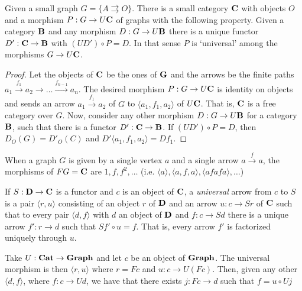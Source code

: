 \documentclass[acmsmall,screen, nonacm, anonymous]{acmart}
\begin{document}
\begin{theorem}

Given a small graph $G = \{A \rightrightarrows O\}$.
There is a small category $\mathbf{C}$ with objects $O$ and a morphism $P : G \to U\mathbf{C}$ of graphs with the following property.
Given a category $\mathbf{B}$  and any morphism $D : G \to U\mathbf{B}$ there is a unique functor $D' : \mathbf{C} \to \mathbf{B}$ with $(U D') \circ P = D$.
In that sense $P$ is `universal' among the morphisms $G \to U\mathbf{C}$.
\end{theorem}
\begin{proof}

Let the objects of $\mathbf{C}$ be the ones of $\mathbf{G}$ and the arrows be the finite paths $a_1 \xrightarrow{f_1} a_2 \xrightarrow{} \ldots \xrightarrow{f_{n-1}} a_{n}$.
The desired morphism $P : G \to U\mathbf{C}$ is identity on objects and sends an arrow $a_1 \xrightarrow{f_{1}} a_2$ of $G$ to $\langle a_1, f_1, a_{2} \rangle$ of $U\mathbf{C}$.
That is, $\mathbf{C}$ is a free category over $G$.
Now, consider any other morphism $D : G \to U\mathbf{B}$ for a category $\mathbf{B}$, such that there is a functor $D' : \mathbf{C} \to \mathbf{B}$.
If $(UD') \circ P = D$, then $D_{O}(G) = D'_{O}(C)$ and $D'\langle a_{1}, f_{1}, a_{2} \rangle = Df_{1}$. 
\end{proof}
\begin{example}
    \item When a graph $G$ is given by a single vertex $a$ and a single arrow $a \xrightarrow{f} a$, the morphisms of $FG = \mathbf{C}$ are $1, f, f^2, \ldots$ (i.e. $\langle a \rangle, \langle a , f, a \rangle, \langle a f a f a \rangle, \ldots$)
\end{example}

\begin{definition}

If $S : \mathbf{D} \to \mathbf{C}$ is a functor and $c$ is an object of $\mathbf{C}$, a \textit{universal} arrow from $c$ to $S$ is a pair $\langle r, u \rangle$ consisting of an object $r$ of $\mathbf{D}$ and an arrow $u : c \to Sr$ of $\mathbf{C}$ such that to every pair $\langle d, f \rangle$ with $d$ an object of $\mathbf{D}$ and $f : c \to Sd$ there is a unique arrow $f' : r \to d$ such that $Sf' \circ u = f$.
That is, every arrow $f'$ is factorized uniquely through $u$.
\end{definition}
\begin{example}

Take $U : \mathbf{Cat} \to \mathbf{Graph}$ and let $c$ be an object of $\mathbf{Graph}$.
The universal morphism is then $\langle r, u \rangle$ where $r = Fc$ and $u : c \to U(Fc)$.
Then, given any other $\langle d, f \rangle$, where $f : c \to Ud$, we have that there exists $j : Fc \to d$ such that $f = u \circ Uj$
\end{example}
\end{document}

